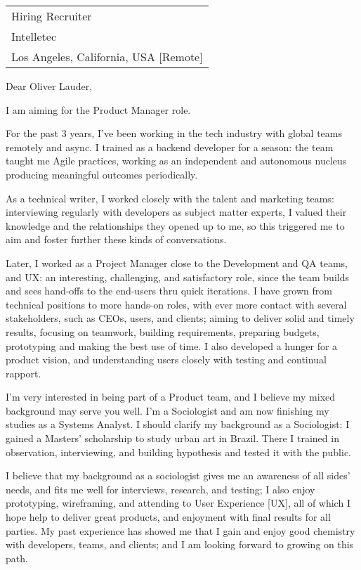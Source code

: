 \begin{tabular}{@{} l}
    Hiring Recruiter \\
    Intelletec \\
    Los Angeles, California, USA [Remote]
\end{tabular}


Dear Oliver Lauder,
\midskip 

I am aiming for the Product Manager role.

For the past 3 years, I've been working in the tech industry with global
teams remotely and async. I trained as a backend developer for a season:
the team taught me Agile practices, working as an independent and
autonomous nucleus producing meaningful outcomes periodically.

As a technical writer, I worked closely with the talent and marketing
teams: interviewing regularly with developers as subject matter experts,
I valued their knowledge and the relationships they opened up to me, so
this triggered me to aim and foster further these kinds of
conversations.

Later, I worked as a Project Manager close to the Development and QA
teams, and UX: an interesting, challenging, and satisfactory role, since
the team builds and sees hand-offs to the end-users thru quick
iterations. I have grown from technical positions to more hands-on
roles, with ever more contact with several stakeholders, such as CEOs,
users, and clients; aiming to deliver solid and timely results, focusing
on teamwork, building requirements, preparing budgets, prototyping and
making the best use of time. I also developed a hunger for a product
vision, and understanding users closely with testing and continual
rapport.

I'm very interested in being part of a Product team, and I believe my
mixed background may serve you well. I'm a Sociologist and am now
finishing my studies as a Systems Analyst. I should clarify my
background as a Sociologist: I gained a Masters' scholarship to study
urban art in Brazil. There I trained in observation, interviewing, and
building hypothesis and tested it with the public.

I believe that my background as a sociologist gives me an awareness of
all sides' needs, and fits me well for interviews, research, and
testing; I also enjoy prototyping, wireframing, and attending to User
Experience {[}UX{]}, all of which I hope help to deliver great products,
and enjoyment with final results for all parties. My past experience has
showed me that I gain and enjoy good chemistry with developers, teams,
and clients; and I am looking forward to growing on this path.

